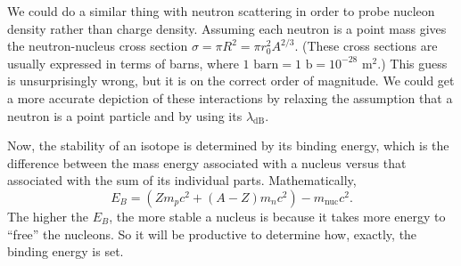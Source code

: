 \documentclass[../p052main.tex]{subfiles}
\begin{document}
We could do a similar thing with neutron scattering in order to probe nucleon density rather than charge density.
Assuming each neutron is a point mass gives the neutron-nucleus cross section $\sigma = \pi R^2 = \pi r_0^2 A^{2 / 3}$.
(These cross sections are usually expressed in terms of barns, where $1 \textrm{ barn} = 1 \textrm{ b} = 10^{-28} \textrm{ m}^2$.)
This guess is unsurprisingly wrong, but it is on the correct order of magnitude.
We could get a more accurate depiction of these interactions by relaxing the assumption that a neutron is a point particle and by using its $\lambda_\textrm{dB}$.

Now, the stability of an isotope is determined by its binding energy, which is the difference between the mass energy associated with a nucleus versus that associated with the sum of its individual parts.
Mathematically,
\[ E_B = \left( Z m_p c^2 + (A - Z) m_n c^2 \right) - m_\textrm{nuc} c^2. \]
The higher the $E_B$, the more stable a nucleus is because it takes more energy to ``free'' the nucleons.
So it will be productive to determine how, exactly, the binding energy is set.
\end{document}
